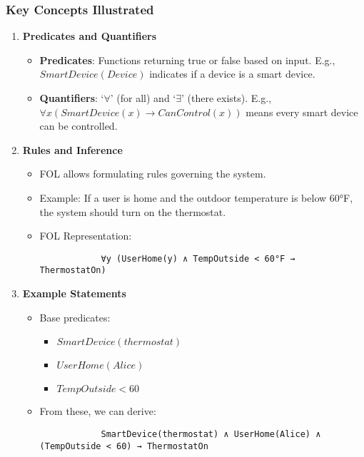 \documentclass[aspectratio=169]{beamer}
\begin{document}
\begin{frame}[fragile]
    \frametitle{Key Concepts Illustrated}
    \begin{enumerate}
        \item \textbf{Predicates and Quantifiers}
        \begin{itemize}
            \item \textbf{Predicates}: Functions returning true or false based on input. E.g., $SmartDevice(Device)$ indicates if a device is a smart device.
            \item \textbf{Quantifiers}: ‘$\forall$’ (for all) and ‘$\exists$’ (there exists). E.g., $\forall x (SmartDevice(x) \to CanControl(x))$ means every smart device can be controlled.
        \end{itemize}
        
        \item \textbf{Rules and Inference}
        \begin{itemize}
            \item FOL allows formulating rules governing the system. 
            \item Example: If a user is home and the outdoor temperature is below 60°F, the system should turn on the thermostat.
            \item FOL Representation:
            \begin{lstlisting}
            ∀y (UserHome(y) ∧ TempOutside < 60°F → ThermostatOn)
            \end{lstlisting}
        \end{itemize}

        \item \textbf{Example Statements}
        \begin{itemize}
            \item Base predicates:
                \begin{itemize}
                    \item $SmartDevice(thermostat)$
                    \item $UserHome(Alice)$
                    \item $TempOutside < 60$
                \end{itemize}
            \item From these, we can derive:
            \begin{lstlisting}
            SmartDevice(thermostat) ∧ UserHome(Alice) ∧ (TempOutside < 60) → ThermostatOn
            \end{lstlisting}
        \end{itemize}
    \end{enumerate}
\end{frame}
\end{document}
